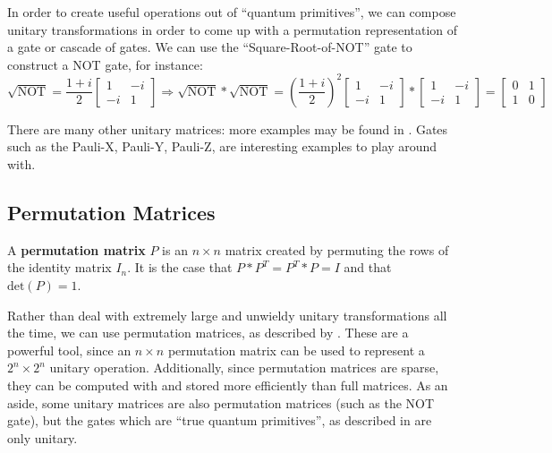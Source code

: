 In order to create useful operations out of ``quantum primitives'', we can compose unitary transformations in order to come up with a permutation representation of a gate or cascade of gates. We can use the ``Square-Root-of-NOT'' gate to construct a NOT gate, for instance:
\[ \sqrt{\text{NOT}} = \frac{1+i}{2}
  \left[
  \begin{matrix}
   1 & -i \\
   -i & 1
  \end{matrix}
  \right] \Rightarrow
  \sqrt{\text{NOT}}*\sqrt{\text{NOT}} = \left(\frac{1+i}{2}\right)^{2} \left[
  \begin{matrix}
   1 & -i \\
   -i & 1
  \end{matrix}
  \right] *
  \left[
  \begin{matrix}
   1 & -i \\
   -i & 1
  \end{matrix}
  \right] =
  \left[
  \begin{matrix}
   0 & 1 \\
   1 & 0
  \end{matrix}
  \right]
\]

There are many other unitary matrices: more examples may be found in \cite{Lukac2003}. Gates such as the Pauli-X, Pauli-Y, Pauli-Z, are interesting examples to play around with. 


\subsection{Permutation Matrices}
\begin{mydef}
 A {\bf permutation matrix} $P$ is an $n \times n$ matrix created by permuting the rows of the identity matrix $I_{n}$. It is the case that $P*P^{T}=P^{T}*P=I$ and that $\text{det}(P)=1$. 
\end{mydef}

Rather than deal with extremely large and unwieldy unitary transformations all the time, we can use permutation matrices, as described by \cite{Williams1999}. These are a powerful tool, since an $n \times n$ permutation matrix can be used to represent a $2^{n} \times 2^{n}$ unitary operation. Additionally, since permutation matrices are sparse, they can be computed with and stored more efficiently than full matrices. As an aside, some unitary matrices are also permutation matrices (such as the NOT gate), but the gates which are ``true quantum primitives'', as described in \cite{Lukac2003} are only unitary. \\

